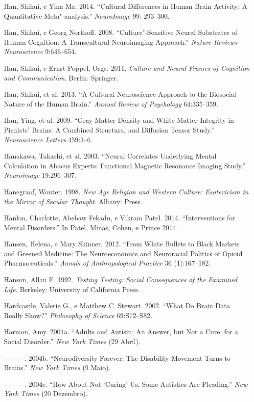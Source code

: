 Han, Shihui, e Yina Ma. 2014. ``Cultural Differences in Human Brain
Activity: A Quantitative Meta"-analysis.'' \emph{NeuroImage} 99:
293--300.

Han, Shihui, e Georg Northoff. 2008. ``Culture"-Sensitive Neural
Substrates of Human Cognition: A Transcultural Neuroimaging Approach.''
\emph{Nature Reviews Neuroscience} 9:646--654.

Han, Shihui, e Ernst Poppel, Orgs. 2011. \emph{Culture and Neural Frames
of Cognition and Communication}. Berlin: Springer.

Han, Shihui, et al. 2013. ``A Cultural Neuroscience Approach to the
Biosocial Nature of the Human Brain.'' \emph{Annual Review of
Psychology} 64:335--359.

Han, Ying, et al. 2009. ``Gray Matter Density and White Matter Integrity
in Pianists' Brains: A Combined Structural and Diffusion Tensor 
Study.'' \emph{Neuroscience Letters} 459:3--6.

Hanakawa, Takashi, et al. 2003. ``Neural Correlates Underlying Mental
Calculation in Abacus Experts: Functional Magnetic Resonance Imaging
Study.'' \emph{Neuroimage} 19:296--307.

Hanegraaf, Wouter. 1998. \emph{New Age Religion and Western Culture:
Esotericism in the Mirror of Secular Thought}. Albany:  Press.

Hanlon, Charlotte, Abebaw Fekadu, e Vikram Patel. 2014. ``Interventions
for Mental Disorders.'' In Patel, Minas, Cohen, e Prince 2014.

Hansen, Helena, e Mary Skinner. 2012. ``From White Bullets to Black
Markets and Greened Medicine: The Neuroeconomics and Neuroracial
Politics of Opioid Pharmaceuticals.'' \emph{Annals of Anthropological
Practice} 36 (1):167--182.

Hanson, Allan F. 1992. \emph{Testing Testing: Social Consequences of the
Examined Life}. Berkeley: University of California Press.

Hardcastle, Valerie G., e Matthew C. Stewart. 2002. ``What Do Brain Data
Really Show?'' \emph{Philosophy of Science} 69:S72--S82.

Harmon, Amy. 2004a. ``Adults and Autism; An Answer, but Not a Cure, for
a Social Disorder.'' \emph{New York Times} (29 Abril).

---------. 2004b. ``Neurodiversity Forever: The Disability Movement
Turns to Brains.'' \emph{New York Times} (9 Maio).

---------. 2004c. ``How About Not `Curing' Us, Some Autistics Are
Pleading.'' \emph{New York Times} (20 Dezembro).

